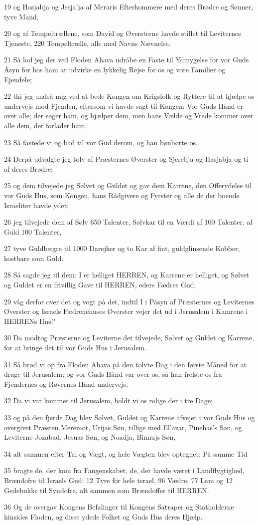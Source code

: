 \par 19 og Hasjabja og Jesja'ja af Meraris Efterkommere med deres Brødre og Sønner, tyve Mand,
\par 20 og af Tempeltrællene, som David og Øversterne havde stillet til Leviternes Tjeneste, 220 Tempeltrælle, alle med Navns Nævnelse.
\par 21 Så lod jeg der ved Floden Ahava udråbe en Faste til Ydmygelse for vor Guds Åsyn for hos ham at udvirke en lykkelig Rejse for os og vore Familier og Ejendele;
\par 22 thi jeg undså mig ved at bede Kongen om Krigsfolk og Ryttere til at hjælpe os undervejs mod Fjenden, eftersom vi havde sagt til Kongen: Vor Guds Hånd er over alle; der søger ham, og hjælper dem, men hans Vælde og Vrede kommer over alle dem, der forlader ham.
\par 23 Så fastede vi og bad til vor Gud derom, og han bønbørte os.
\par 24 Derpå udvalgte jeg tolv af Præsternes Øverster og Sjerebja og Hasjabja og ti af deres Brødre;
\par 25 og dem tilvejede jeg Sølvet og Guldet og gav dem Karrene, den Offerydelse til vor Guds Hus, som Kongen, hans Rådgivere og Fyrster og alle de der boende Israeliter havde ydet;
\par 26 jeg tilvejede dem af Sølv 650 Talenter, Sølvkar til en Værdi af 100 Talenter, af Guld 100 Talenter,
\par 27 tyve Guldbægre til 1000 Darejker og to Kar af fint, guldglinsende Kobber, kostbare som Guld.
\par 28 Så sagde jeg til dem: I er helliget HERREN, og Karrene er helliget, og Sølvet og Guldet er en frivillig Gave til HERREN, eders Fædres Gud;
\par 29 våg derfor over det og vogt på det, indtil I i Påsyn af Præsternes og Leviternes Øverster og Israels Fædrenehuses Øverster vejer det ud i Jerusalem i Kamrene i HERRENs Hus!"
\par 30 Da modtog Præsterne og Leviterne det tilvejede, Sølvet og Guldet og Karrene, for at bringe det til vor Guds Hus i Jerusalem.
\par 31 Så brød vi op fra Floden Ahava på den tolvte Dag i den første Måned for at drage til Jerusalem; og vor Guds Hånd var over os, så han frelste os fra Fjendernes og Røvernes Hånd undervejs.
\par 32 Da vi var kommet til Jerusalem, holdt vi os rolige der i tre Dage;
\par 33 og på den fjerde Dag blev Sølvet, Guldet og Karrene afvejet i vor Guds Hus og overgivet Præsten Meremot, Urijas Søn, tillige med El'azar, Pinehas's Søn, og Leviterne Jozabad, Jesuas Søn, og Noadja, Binnujs Søn,
\par 34 alt sammen efter Tal og Vægt, og hele Vægten blev optegnet: På samme Tid
\par 35 bragte de, der kom fra Fangenskabet, de, der havde været i Landflygtighed, Brændofre til Israels Gud: 12 Tyre for hele tsrael, 96 Vædre, 77 Lam og 12 Gedebukke til Syndofre, alt sammen som Brændoffer til HERREN.
\par 36 Og de overgav Kongens Befalinger til Kongens Satraper og Statholderne hinsides Floden, og disse ydede Folket og Guds Hus deres Hjælp.

